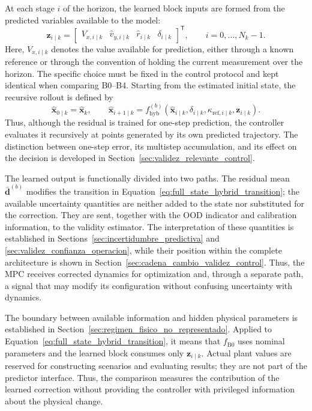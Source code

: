 \documentclass[12pt,a4paper]{report}
\begin{document}
At each stage $i$ of the horizon, the learned block inputs are formed from the predicted variables available to the model:
\begin{equation}
    \mathbf z_{i\mid k}
    =
    \begin{bmatrix}
        V_{x,i\mid k} &
        \hat v_{y,i\mid k} &
        \hat r_{i\mid k} &
        \delta_{i\mid k}
    \end{bmatrix}^{\mathsf T},
    \qquad i=0,\ldots,N_k-1.
    \label{eq:hybrid_rollout_features}
\end{equation}
Here, $V_{x,i\mid k}$ denotes the value available for prediction, either through a known reference or through the convention of holding the current measurement over the horizon. The specific choice must be fixed in the control protocol and kept identical when comparing B0--B4. Starting from the estimated initial state, the recursive rollout is defined by
\begin{equation}
    \hat{\mathbf x}_{0\mid k}=\hat{\mathbf x}_k,
    \qquad
    \hat{\mathbf x}_{i+1\mid k}
    =
    f_{\mathrm{hyb}}^{(b)}
    \!\left(
        \hat{\mathbf x}_{i\mid k},
        \delta_{i\mid k},
        \kappa_{\mathrm{ref},i\mid k},
        \mathbf z_{i\mid k}
    \right).
    \label{eq:hybrid_multistep_rollout}
\end{equation}
Thus, although the residual is trained for one-step prediction, the controller evaluates it recursively at points generated by its own predicted trajectory. The distinction between one-step error, its multistep accumulation, and its effect on the decision is developed in Section~\ref{sec:validez_relevante_control}.

The learned output is functionally divided into two paths. The residual mean $\bar{\mathbf d}^{(b)}$ modifies the transition in Equation~\eqref{eq:full_state_hybrid_transition}; the available uncertainty quantities are neither added to the state nor substituted for the correction. They are sent, together with the OOD indicator and calibration information, to the validity estimator. The interpretation of these quantities is established in Sections~\ref{sec:incertidumbre_predictiva} and \ref{sec:validez_confianza_operacion}, while their position within the complete architecture is shown in Section~\ref{sec:cadena_cambio_validez_control}. Thus, the MPC receives corrected dynamics for optimization and, through a separate path, a signal that may modify its configuration without confusing uncertainty with dynamics.

The boundary between available information and hidden physical parameters is established in Section~\ref{sec:regimen_fisico_no_representado}. Applied to Equation~\eqref{eq:full_state_hybrid_transition}, it means that $f_{\mathrm{B0}}$ uses nominal parameters and the learned block consumes only $\mathbf z_{i\mid k}$. Actual plant values are reserved for constructing scenarios and evaluating results; they are not part of the predictor interface. Thus, the comparison measures the contribution of the learned correction without providing the controller with privileged information about the physical change.
\end{document}

